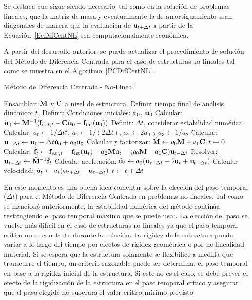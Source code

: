 Se destaca que sigue siendo necesario, tal como en la solución de problemas lineales, que la matriz de masa y eventualmente la de amortiguamiento sean diagonales de manera que la evaluación de ${\bf u}_{t+\Delta t}$ a partir de la Ecuación~\eqref{EcDifCentNL} sea computacionalmente económica.

A partir del desarrollo anterior, se puede actualizar el procedimiento de solución del Método de Diferencia Centrada para el caso de estructuras no lineales tal como se muestra en el Algoritmo~\ref{PCDifCentNL}.

\begin{algorithm}
	
	\caption{Método de Diferencia Centrada - No-Lineal}
	\label{PCDifCentNL}
	
	\begin{algorithmic}[1]
		
		\STATE Ensamblar: ${\bf M}$ y ${\bf C}$ a nivel de estructura.
		\STATE Definir: tiempo final de análisis dinámico: $t_f$
		\STATE Definir: Condiciones iniciales: ${\bf u}_{0}$, $\dot{{\bf u}}_{0}$
		\STATE Calcular: $\ddot{{\bf u}}_{0}\leftarrow {\bf M}^{-1}({\bf f}_{ext,t} - {\bf C} \dot{{\bf u}}_0 - {\bf f}_{\text{int}}({\bf u}_0))$
		\STATE Definir: $\Delta t$, considerar estabilidad numérica.
		\STATE Calcular: $a_0\leftarrow1/\Delta t^2$, $a_1\leftarrow1/(2\Delta t)$, $a_2\leftarrow2a_0$ y $a_3\leftarrow1/a_2$
		\STATE Calcular: ${\bf u}_{-\Delta t} \leftarrow {\bf u}_0 - \Delta t \dot{{\bf u}}_0 + a_3\ddot{{\bf u}}_0$
		\STATE Calcular y factorizar: $\hat{{\bf M}}\leftarrow a_0{\bf M}+a_1{\bf C}$
		\STATE $t \leftarrow 0$
		\STATE Calcular: $\hat{{\bf f}}_t\leftarrow {\bf f}_{ext,t} -{\bf f}_{\text{int}}({\bf u}_t) +a_2{\bf M} {\bf u}_t - (a_0{\bf M}-a_1{\bf C}){\bf u}_{t-\Delta t}$
		\STATE Resolver: ${\bf u}_{t+\Delta t}\leftarrow \hat{{\bf M}}^{-1}\hat{{\bf f}}_t$
		\STATE Calcular aceleración: $\ddot{{\bf u}}_{t}\leftarrow a_0({\bf u}_{t+\Delta t}-2{\bf u}_{t}+{\bf u}_{t-\Delta t})$
		\STATE Calcular velocidad: $\dot{{\bf u}}_{t}\leftarrow a_1({\bf u}_{t+\Delta t}-{\bf u}_{t-\Delta t})$
		\STATE $t\leftarrow t+\Delta t$
		\ENDWHILE
		
	\end{algorithmic}
	
\end{algorithm}

En este momento es una buena idea comentar sobre la elección del paso temporal ($\Delta t$) para el Método de Diferencia Centrada en problemas no lineales. Tal como se mencionó anteriormente, la estabilidad numérica del método continúa restringiendo el paso temporal máximo que se puede usar. La elección del paso se vuelve más difícil en el caso de estructuras no lineales ya que el paso temporal crítico no es constante durante la solución. %
%
La rigidez de la estructura puede variar a lo largo del tiempo por efectos de rigidez geométrica o por no linealidad material. Si se espera que la estructura solamente se flexibilice a medida que transcurre el tiempo, un criterio razonable puede ser determinar el paso temporal en base a la rigidez inicial de la estructura. Si este no es el caso, se debe prever el efecto de la rigidización de la estructura en el paso temporal crítico y asegurar que el paso elegido no superará el valor crítico mínimo previsto.

